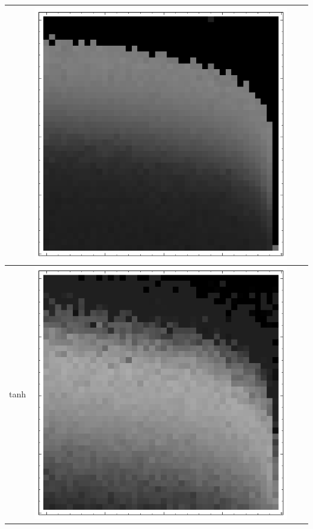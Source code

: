 \documentclass[10pt]{article}
\begin{document}
\begin{tabular}{|c|c|c|c|}
        & \includegraphics[scale=0.25]{plots/simple/LF-20S10S-20T10-CIFAR-3.png} \\ \hline
tanh 
        & \includegraphics[scale=0.25]{plots/simple/LF-20T10T-20T10-CIFAR-1.png}

\end{tabular}
\end{document}

